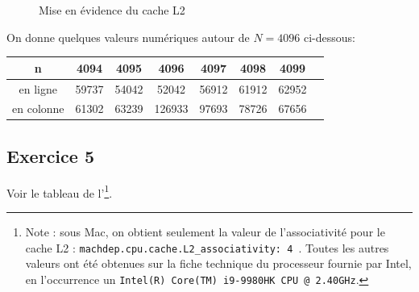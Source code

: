 \documentclass[11pt, a4 paper]{article}
\begin{document}
\begin{figure}[!h]
    \caption{Mise en évidence du cache L2}
\end{figure}

On donne quelques valeurs numériques autour de $N = 4096$ ci-dessous:
\begin{center}
    \begin{tabular}{| c | c | c | c | c | c | c | c |}
        \hline
    n & 4094 & 4095 & 4096 & 4097 & 4098 & 4099 \\
    \hline
    en ligne & 59737 & 54042 & 52042 & 56912 & 61912 & 62952 \\
    \hline
    en colonne & 61302 & 63239 & 126933 & 97693 & 78726 & 67656 \\
    \hline
    \end{tabular}
\end{center}

\subsection{Exercice 5}
Voir le tableau de l'\footnote{Note : sous Mac, on obtient seulement la valeur de l'associativité pour le cache L2 : \texttt{machdep.cpu.cache.L2\_associativity: 4
}.
Toutes les autres valeurs ont été obtenues sur la fiche technique du processeur fournie par Intel, en l'occurrence un \texttt{Intel(R) Core(TM) i9-9980HK CPU @ 2.40GHz}.}.\\
\end{document}

